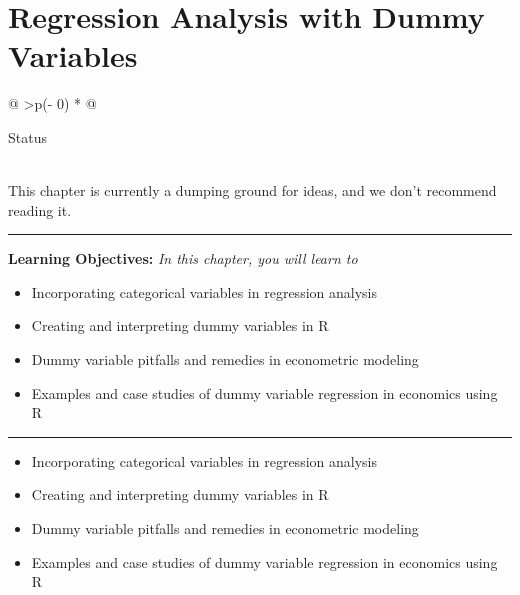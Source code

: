 \documentclass[
  letterpaper,
  paper =a4,
  twoside,
  openright,
  headsepline,
  footsepline,
  listof = totocnumbered,
  chapterprefix = true,
  firstiscover]{scrbook}
\providecommand{\abstractname}{Learning Objectives} %
\newenvironment{objectives}[1]{%
	\hrule
	\vspace{5pt}
	\small\textbf{\abstractname: } 
	\newline
	\vspace{0.1cm}
	\small\emph{#1} %
	\itshape %
}{%
	\vspace{5pt}
	\hrule
	\vspace{0.6cm}
}
\begin{document}
\hypertarget{regression-analysis-with-dummy-variables}{%
\chapter{Regression Analysis with Dummy
Variables}\label{regression-analysis-with-dummy-variables}}

\begin{longtable}[]{@{}
  >{\centering\arraybackslash}p{(\columnwidth - 0\tabcolsep) * }@{}}
\toprule\noalign{}
\begin{minipage}[b]{\linewidth}\centering
Status
\end{minipage} \\
\midrule\noalign{}
\endhead
\bottomrule\noalign{}
\endlastfoot
This chapter is currently a dumping ground for ideas, and we don't
recommend reading it. \\
\end{longtable}

\begin{objectives}{In this chapter, you will learn to}
\begin{itemize}

\item{Incorporating categorical variables in regression analysis}

\item{Creating and interpreting dummy variables in R}

\item{Dummy variable pitfalls and remedies in econometric modeling}

\item{Examples and case studies of dummy variable regression in economics using R}

\end{itemize}

\end{objectives}

\begin{itemize}
\item
  Incorporating categorical variables in regression analysis
\item
  Creating and interpreting dummy variables in R
\item
  Dummy variable pitfalls and remedies in econometric modeling
\item
  Examples and case studies of dummy variable regression in economics
  using R
\end{itemize}

\end{document}
